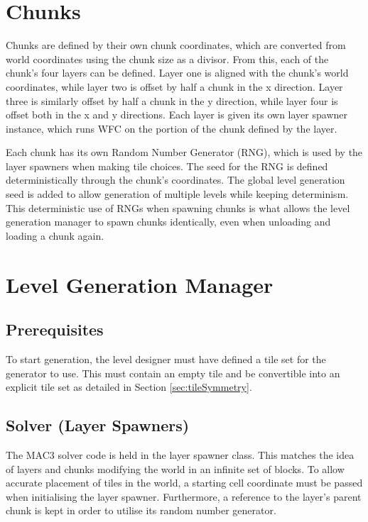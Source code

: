 \section{Chunks}
Chunks are defined by their own chunk coordinates, which are converted from world coordinates using the chunk size as a divisor. From this, each of the chunk's four layers can be defined. Layer one is aligned with the chunk's world coordinates, while layer two is offset by half a chunk in the x direction. Layer three is similarly offset by half a chunk in the y direction, while layer four is offset both in the x and y directions. Each layer is given its own layer spawner instance, which runs WFC on the portion of the chunk defined by the layer.


Each chunk has its own Random Number Generator (RNG), which is used by the layer spawners when making tile choices. The seed for the RNG is defined deterministically through the chunk's coordinates. The global level generation seed is added to allow generation of multiple levels while keeping determinism. This deterministic use of RNGs when spawning chunks is what allows the level generation manager to spawn chunks identically, even when unloading and loading a chunk again.

\section{Level Generation Manager}
\subsection{Prerequisites}
To start generation, the level designer must have defined a tile set for the generator to use. This must contain an empty tile and be convertible into an explicit tile set as detailed in Section \ref{sec:tileSymmetry}.

\subsection{Solver (Layer Spawners)}
The MAC3 solver code is held in the layer spawner class. This matches the idea of layers and chunks modifying the world in an infinite set of blocks. To allow accurate placement of tiles in the world, a starting cell coordinate must be passed when initialising the layer spawner. Furthermore, a reference to the layer's parent chunk is kept in order to utilise its random number generator.

